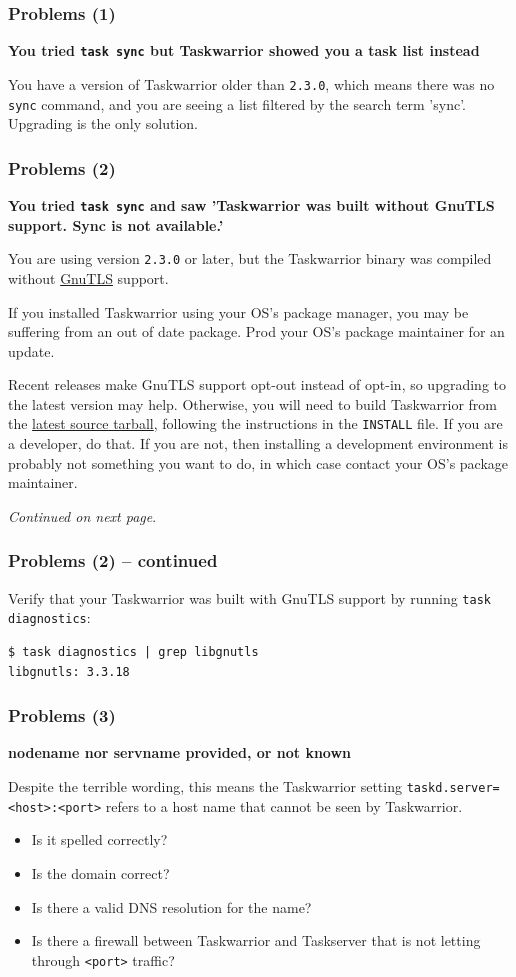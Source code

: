 \documentclass[t,handout]{beamer}
\begin{document}
\begin{frame}[fragile]\frametitle{Problems (1)}
    \textbf{You tried \texttt{task sync} but Taskwarrior showed you a task list instead}

    You have a version of Taskwarrior older than \verb+2.3.0+, which means there was no \verb+sync+ command, and you are seeing a list filtered by the search term 'sync'. Upgrading is the only solution.
\end{frame}

\begin{frame}[fragile]\frametitle{Problems (2)}
    \textbf{You tried \texttt{task sync} and saw 'Taskwarrior was built without GnuTLS support.  Sync is not available.'}

    You are using version \verb+2.3.0+ or later, but the Taskwarrior binary was compiled without \href{http://www.gnutls.org}{GnuTLS} support.

    If you installed Taskwarrior using your OS's package manager, you may be suffering from an out of date package. Prod your OS's package maintainer for an update.

    Recent releases make GnuTLS support opt-out instead of opt-in, so upgrading to the latest version may help. Otherwise, you will need to build Taskwarrior from the \href{http://taskwarrior.org/download/task-latest.tar.gz}{latest source tarball}, following the instructions in the \verb+INSTALL+ file. If you are a developer, do that. If you are not, then installing a development environment is probably not something you want to do, in which case contact your OS's package maintainer.

    \emph{Continued on next page}.
\end{frame}

\begin{frame}[fragile]\frametitle{Problems (2) -- continued}
    Verify that your Taskwarrior was built with GnuTLS support by running \verb+task diagnostics+:

    \begin{lstlisting}
$ task diagnostics | grep libgnutls
libgnutls: 3.3.18\end{lstlisting}
\end{frame}

\begin{frame}[fragile]\frametitle{Problems (3)}
    \textbf{nodename nor servname provided, or not known}

    Despite the terrible wording, this means the Taskwarrior setting \verb+taskd.server=<host>:<port>+ refers to a host name that cannot be seen by Taskwarrior.

    \begin{itemize}
        \item Is it spelled correctly?
        \item Is the domain correct?
        \item Is there a valid DNS resolution for the name?
        \item Is there a firewall between Taskwarrior and Taskserver that is not letting through \verb+<port>+ traffic?
    \end{itemize}
\end{frame}
\end{document}
